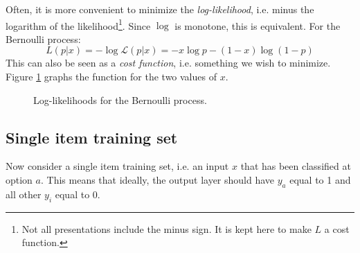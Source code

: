 \documentclass[12pt, a4paper]{article}
\numberwithin{equation}{section}
\begin{document}
Often, it is more convenient to minimize the \textit{log-likelihood}, i.e. minus the logarithm of the likelihood\footnote{Not all presentations include the minus sign. It is kept here to make $L$ a cost function.}. Since $\log$ is monotone, this is equivalent. For the Bernoulli process:
\begin{equation}
L(p|x)=-\log\mathcal{L}(p|x)=-x\log p-(1-x)\log(1-p)
\end{equation}
This can also be seen as a \textit{cost function}, i.e. something we wish to minimize. Figure \ref{fig:bernoulli} graphs the function for the two values of $x$.

\begin{figure}
\centering
{}
\caption{Log-likelihoods for the Bernoulli process.}
\label{fig:bernoulli}
\end{figure}

\subsection{Single item training set}
Now consider a single item training set, i.e. an input $x$ that has been classified at option $a$. This means that ideally, the output layer should have $y_a$ equal to 1 and all other $y_i$ equal to 0.
\end{document}

